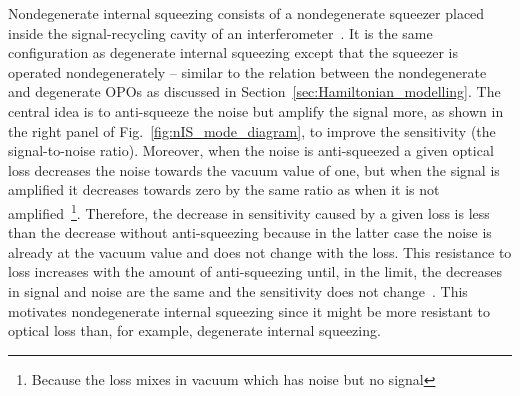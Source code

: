 Nondegenerate internal squeezing consists of a nondegenerate squeezer placed inside the signal-recycling cavity of an interferometer~\cite{}. It is the same configuration as degenerate internal squeezing except that the squeezer is operated nondegenerately -- similar to the relation between the nondegenerate and degenerate OPOs as discussed in Section~\ref{sec:Hamiltonian_modelling}. The central idea is to anti-squeeze the noise but amplify the signal more, as shown in the right panel of Fig.~\ref{fig:nIS_mode_diagram}, to improve the sensitivity (the signal-to-noise ratio).
Moreover, when the noise is anti-squeezed a given optical loss decreases the noise towards the vacuum value of one, but when the signal is amplified it decreases towards zero by the same ratio as when it is not amplified~\footnote{Because the loss mixes in vacuum which has noise but no signal}. Therefore, the decrease in sensitivity caused by a given loss is less than the decrease without anti-squeezing because in the latter case the noise is already at the vacuum value and does not change with the loss. This resistance to loss increases with the amount of anti-squeezing until, in the limit, the decreases in signal and noise are the same and the sensitivity does not change~\cite{}. %
This motivates nondegenerate internal squeezing since it might be more resistant to optical loss than, for example, degenerate internal squeezing. %

